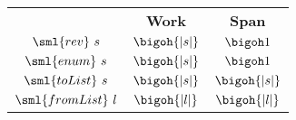 \begin{cluster}
\label{grp:cst:array-seq::miscellaneous}

\begin{costspec}[Miscellaneous]
\label{cst:array-seq::miscellaneous}
\begin{tabular}{c|c|c}
& \textbf{Work} & \textbf{Span} \\
$\sml{rev}~s$ &
$\displaystyle \bigoh{|s|}$ &
$\displaystyle \bigoh 1$ \\
$\sml{enum}~s$ &
$\displaystyle \bigoh{|s|}$ &
$\displaystyle \bigoh 1$ \\
$\sml{toList}~s$ &
$\bigoh{|s|}$ &
$\bigoh{|s|}$ \\
$\sml{fromList}~l$ &
$\bigoh{|l|}$ &
$\bigoh{|l|}$ \\
\end{tabular}

\end{costspec}
\end{cluster}

